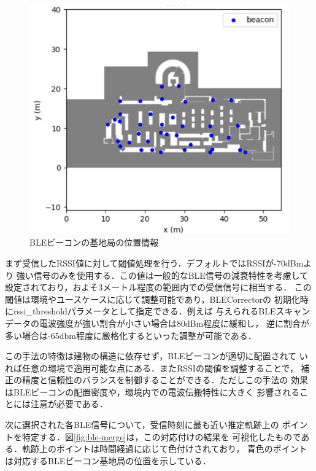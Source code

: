 \begin{figure}[H]
	\centering
	\includegraphics[width=\linewidth]{image/ble-beacon-position.jpg}
	\caption{BLEビーコンの基地局の位置情報}    \label{fig:ble-beacon-position}
\end{figure}

まず受信したRSSI値に対して閾値処理を行う．デフォルトではRSSIが-70dBmより
強い信号のみを使用する．この値は一般的なBLE信号の減衰特性を考慮して
設定されており，およそ3メートル程度の範囲内での受信信号に相当する．
この閾値は環境やユースケースに応じて調整可能であり，BLECorrectorの
初期化時にrssi\_thresholdパラメータとして指定できる．例えば
与えられるBLEスキャンデータの電波強度が強い割合が小さい場合は80dBm程度に緩和し，
逆に割合が多い場合は-65dbm程度に厳格化するといった調整が可能である．

この手法の特徴は建物の構造に依存せず，BLEビーコンが適切に配置されて
いれば任意の環境で適用可能な点にある．またRSSIの閾値を調整することで，
補正の精度と信頼性のバランスを制御することができる．ただしこの手法の
効果はBLEビーコンの配置密度や，環境内での電波伝搬特性に大きく
影響されることには注意が必要である．

次に選択された各BLE信号について，受信時刻に最も近い推定軌跡上の
ポイントを特定する．図\ref{fig:ble-merge}は，この対応付けの結果を
可視化したものである．軌跡上のポイントは時間経過に応じて色付けされており，
青色のポイントは対応するBLEビーコン基地局の位置を示している．


